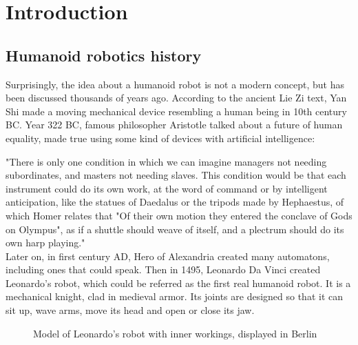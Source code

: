 \documentclass[pdftex,12pt,a4paper]{article}
\begin{document}
  \newpage
  \section{Introduction}
  \subsection{Humanoid robotics history}
  Surprisingly, the idea about a humanoid robot is not a modern concept, but has been discussed thousands of years ago. According to the ancient Lie Zi text, Yan Shi made a moving mechanical device resembling a human being in 10th century BC. Year 322 BC, famous philosopher Aristotle talked about a future of human equality, made true using some kind of devices with artificial intelligence:
  
  "There is only one condition in which we can imagine managers not needing subordinates, and masters not needing slaves. This condition would be that each instrument could do its own work, at the word of command or by intelligent anticipation, like the statues of Daedalus or the tripods made by Hephaestus, of which Homer relates that "Of their own motion they entered the conclave of Gods on Olympus", as if a shuttle should weave of itself, and a plectrum should do its own harp playing."\\
  Later on, in first century AD, Hero of Alexandria created many automatons, including ones that could speak. Then in 1495, Leonardo Da Vinci created Leonardo's robot, which could be referred as the first real humanoid robot. It is a mechanical knight, clad in medieval armor. Its joints are designed so that it can sit up, wave arms, move its head and open or close its jaw.
  \begin{figure}[h]
      \centering
      \caption{Model of Leonardo's robot with inner workings, displayed in Berlin}
      \label{fig:leonardo_robot}
  \end{figure}
  
\end{document}
